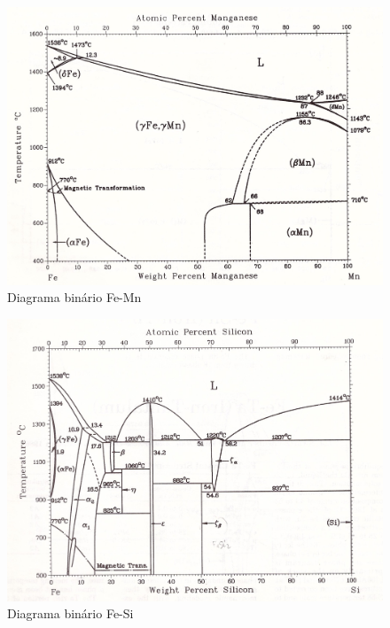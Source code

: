 \documentclass[brazil,tf,epusp]{usp}  %
\begin{document}
\begin{figure}
  \includegraphics[width=1.1\textwidth]{img/Fe-Mn.jpg}
  \caption{Diagrama binário Fe-Mn}
  \label{fig:bin_fe-mn}
\end{figure}

\begin{figure}
  \includegraphics[width=1.1\textwidth]{img/Fe-Si.jpg}
  \caption{Diagrama binário Fe-Si}
  \label{fig:bin_fe-si}
\end{figure}
\end{document}
